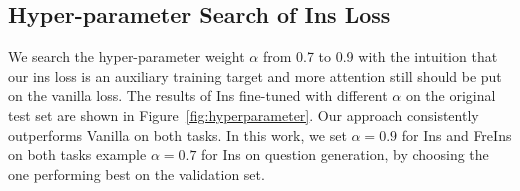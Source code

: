 
%	

\subsection{Hyper-parameter Search of Ins Loss}

We search the hyper-parameter weight $\alpha$ from 0.7 to 0.9 with the intuition that our ins loss is an auxiliary training target and more attention still should be put on the vanilla loss. The results of Ins fine-tuned with different $\alpha$ on the original test set are shown in Figure~\ref{fig:hyperparameter}. Our approach consistently outperforms Vanilla on both tasks. In this work, we set $\alpha=0.9$ for Ins and FreIns on both tasks example $\alpha=0.7$ for Ins on question generation, by choosing the one performing best on the validation set.

